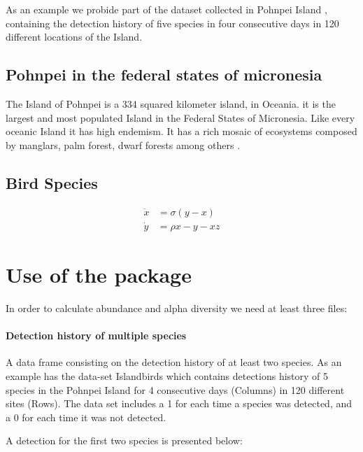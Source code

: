 \documentclass[article]{jss}
\begin{document}
As an example we probide part of the dataset collected in Pohnpei Island
\citep{oleiro2014avian}, containing the detection history of five
species in four consecutive days in 120 different locations of the
Island.

\subsection{Pohnpei in the federal states of
micronesia}\label{pohnpei-in-the-federal-states-of-micronesia}

The Island of Pohnpei is a 334 squared kilometer island, in Oceania. it
is the largest and most populated Island in the Federal States of
Micronesia. Like every oceanic Island it has high endemism. It has a
rich mosaic of ecosystems composed by manglars, palm forest, dwarf
forests among others
\citep{raynor1994resource, buden2000comparison, merlin2005kava}.

\subsection{Bird Species}\label{bird-species}

\[
\begin{aligned}
  \dot{x} & = \sigma(y-x) \\
  \dot{y} & = \rho x- y - xz 
\end{aligned}
\]

\section{Use of the package}\label{use-of-the-package}

In order to calculate abundance and alpha diversity we need at least
three files:

\paragraph{Detection history of multiple
species}\label{detection-history-of-multiple-species}

A data frame consisting on the detection history of at least two
species. As an example  has the data-set
Islandbirds which contains detections history of 5 species in the
Pohnpei Island for 4 consecutive days (Columns) in 120 different sites
(Rows). The data set includes a 1 for each time a species was detected,
and a 0 for each time it was not detected.

A detection for the first two species is presented below:
\end{document}
